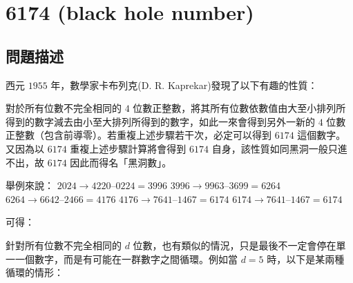 \section{6174 (black hole number)}

\subsection{問題描述}

西元 \(1955\) 年，數學家卡布列克(D. R. Kaprekar)發現了以下有趣的性質：

對於所有位數不完全相同的 \(4\)
位數正整數，將其所有位數依數值由大至小排列所得到的數字減去由小至大排列所得到的數字，如此一來會得到另外一新的
\(4\) 位數正整數（包含前導零）。若重複上述步驟若干次，必定可以得到
\(6174\) 這個數字。又因為以 \(6174\) 重複上述步驟計算將會得到 \(6174\)
自身，該性質如同黑洞一般只進不出，故 \(6174\) 因此而得名「黑洞數」。

舉例來說： \newline \qquad \(2024 \longrightarrow 4220 – 0224 = 3996\)
\newline \qquad \(3996 \longrightarrow 9963 – 3699 = 6264\) \newline
\qquad \(6264 \longrightarrow 6642 – 2466 = 4176\) \newline
\qquad \(4176 \longrightarrow 7641 – 1467 = 6174\) \newline
\qquad \(6174 \longrightarrow 7641 – 1467 = 6174\)

可得： \newline \vspace{-3em}


針對所有位數不完全相同的 \(d\)
位數，也有類似的情況，只是最後不一定會停在單一一個數字，而是有可能在一群數字之間循環。例如當
\(d = 5\) 時，以下是某兩種循環的情形： \newline  \vspace{-1em}


